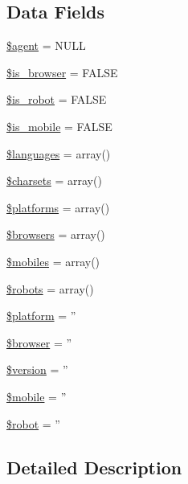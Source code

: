 \subsection*{Data Fields}
\begin{DoxyCompactItemize}
\item 
\hyperlink{class_c_i___user__agent_a0606e5b321c8c85527efdd1c17a9a569}{\$agent} = N\-U\-L\-L
\item 
\hyperlink{class_c_i___user__agent_af9608f790bc03edf6c152d11cd879e04}{\$is\-\_\-browser} = F\-A\-L\-S\-E
\item 
\hyperlink{class_c_i___user__agent_a4b3d4b92832b15f313661bc9af0323fa}{\$is\-\_\-robot} = F\-A\-L\-S\-E
\item 
\hyperlink{class_c_i___user__agent_a15f8c9cdaac57894151997b80f38224d}{\$is\-\_\-mobile} = F\-A\-L\-S\-E
\item 
\hyperlink{class_c_i___user__agent_a8856d0a49881ef8e0a6d205d37d4a7af}{\$languages} = array()
\item 
\hyperlink{class_c_i___user__agent_ae269ee30c94deb9b791c1ae5489b88f3}{\$charsets} = array()
\item 
\hyperlink{class_c_i___user__agent_a1c1a0a860242698ee6b3f4ef7d6eb343}{\$platforms} = array()
\item 
\hyperlink{class_c_i___user__agent_a81edf933083b5ac5b380385f59074a7d}{\$browsers} = array()
\item 
\hyperlink{class_c_i___user__agent_a6928dde5aa0be443766d5b2376de908a}{\$mobiles} = array()
\item 
\hyperlink{class_c_i___user__agent_a5752e2a66d1c03bc34666492746037ab}{\$robots} = array()
\item 
\hyperlink{class_c_i___user__agent_a9cb2b1a2275f65f39415f0366139fb1c}{\$platform} = ''
\item 
\hyperlink{class_c_i___user__agent_ada6112ba48917a0c8cc154ed90908b28}{\$browser} = ''
\item 
\hyperlink{class_c_i___user__agent_a17c8948c68aa44fa9961ae169b6a8961}{\$version} = ''
\item 
\hyperlink{class_c_i___user__agent_a4144d0c9c54f204811328b221f06fc3d}{\$mobile} = ''
\item 
\hyperlink{class_c_i___user__agent_aaf86508e45876d0081cadac4cb8a8808}{\$robot} = ''
\end{DoxyCompactItemize}


\subsection{Detailed Description}


